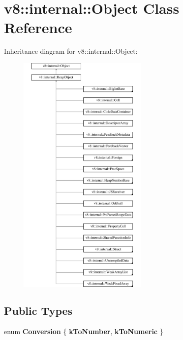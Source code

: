 \hypertarget{classv8_1_1internal_1_1Object}{}\section{v8\+:\+:internal\+:\+:Object Class Reference}
\label{classv8_1_1internal_1_1Object}
Inheritance diagram for v8\+:\+:internal\+:\+:Object\+:\begin{figure}[H]
\begin{center}
\leavevmode
\includegraphics[height=12.000000cm]{classv8_1_1internal_1_1Object}
\end{center}
\end{figure}
\subsection*{Public Types}
\begin{DoxyCompactItemize}
\item 
\mbox{\label{classv8_1_1internal_1_1Object_ad3c57bab5cf5a7f19488a69695419e39}} 
enum {\bfseries Conversion} \{ {\bfseries k\+To\+Number}, 
{\bfseries k\+To\+Numeric}
 \}
\end{DoxyCompactItemize}
